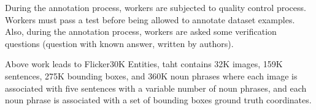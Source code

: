 During the annotation process, workers are subjected to quality
control process. Workers must pass a test before being allowed to
annotate dataset examples. Also, during the annotation process,
workers are asked some verification questions (question with known
answer, written by authors).

Above work leads to Flicker30K Entities, taht contains 32K images,
159K sentences, 275K bounding boxes, and 360K noun phrases where each
image is associated with five sentences with a variable number of noun
phrases, and each noun phrase is associated with a set of bounding
boxes ground truth coordinates. 
